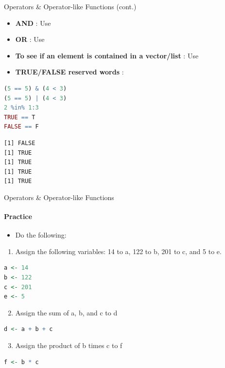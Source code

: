 \begin{frame}[fragile]{Operators \& Operator-like Functions (cont.)}
\begin{itemize}
  \item \textbf{AND} : Use \code{\&}
  \item \textbf{OR} : Use \code{|}
  \item \textbf{To see if an element is contained in a vector/list} : Use 
  \item \textbf{TRUE/FALSE reserved words} : 
\end{itemize}
\begin{lstlisting}[language=R]
(5 == 5) & (4 < 3)
(5 == 5) | (4 < 3)
2 %in% 1:3
TRUE == T
FALSE == F
\end{lstlisting}
\begin{lstlisting}[style=output]
[1] FALSE
[1] TRUE
[1] TRUE
[1] TRUE
[1] TRUE
\end{lstlisting}
\end{frame}

\begin{frame}[fragile]{Operators \& Operator-like Functions}
\framesubtitle{Practice}
\begin{itemize}
  \item Do the following:
\end{itemize}
\begin{enumerate}
  \item Assign the following variables: 14 to a, 122 to b, 201 to c, and 5 to e.
\end{enumerate}
\begin{lstlisting}[language=R]
a <- 14
b <- 122
c <- 201
e <- 5
\end{lstlisting}
\begin{enumerate}\setcounter{enumi}{1}
  \item Assign the sum of a, b, and c to d
\end{enumerate}
\begin{lstlisting}[language=R]
d <- a + b + c
\end{lstlisting}
\begin{enumerate}\setcounter{enumi}{2}
  \item Assign the product of b times c to f
\end{enumerate}
\begin{lstlisting}[language=R]
f <- b * c
\end{lstlisting}
\end{frame}

